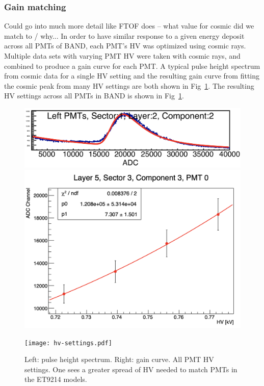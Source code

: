 \documentclass[review]{elsarticle}
\begin{document}
\subsubsection{Gain matching}
{\color{red}Could go into much more detail like FTOF does -- what value for cosmic did we match to / why...}
In order to have similar response to a given energy deposit across all PMTs of BAND, each PMT's HV was optimized using
cosmic rays. Multiple data sets with varying PMT HV were taken with cosmic rays, and combined to produce a gain curve for 
each PMT. A typical pulse height spectrum from cosmic data for a single HV setting and the resulting gain curve from fitting the 
cosmic peak from many HV settings are both shown in Fig~\ref{fig:hv_settings}. The resulting HV settings across all PMTs in BAND is 
shown in Fig~\ref{fig:hv_settings}.
\begin{figure}[h!]
	\centering
		\begin{minipage}{0.48\textwidth}
			\includegraphics[width=\textwidth]{adc-spectra.png}\\
			\includegraphics[width=\textwidth]{gain-curve.png}
			\label{fig:gain}
		\end{minipage}
		\begin{minipage}{0.48\textwidth}
			\texttt{[image: hv-settings.pdf]}
		\end{minipage}
		
		\caption{Left: pulse height spectrum. Right: gain curve. All PMT HV settings. One sees a greater 
		spread of HV needed to match PMTs in the ET9214 models.}
		\label{fig:hv_settings}
\end{figure}
\end{document}
